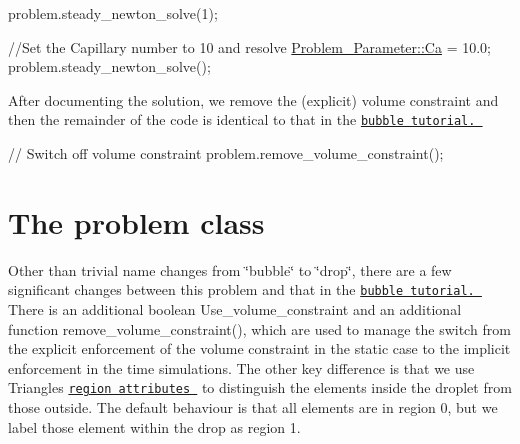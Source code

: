 \begin{DoxyCodeInclude}
 problem.steady\_newton\_solve(1); 

 \textcolor{comment}{//Set the Capillary number to 10 and resolve}
 \hyperlink{namespaceProblem__Parameter_af6194d2571881779c678fbabc1503d47}{Problem\_Parameter::Ca} = 10.0;
 problem.steady\_newton\_solve();

\end{DoxyCodeInclude}


After documenting the solution, we remove the (explicit) volume constraint and then the remainder of the code is identical to that in the \href{../../adaptive_bubble_in_channel/html/index.html}{\tt bubble tutorial. }


\begin{DoxyCodeInclude}
 \textcolor{comment}{// Switch off volume constraint}
 problem.remove\_volume\_constraint();

\end{DoxyCodeInclude}




 

\hypertarget{index_problem}{}\section{The problem class}\label{index_problem}
Other than trivial name changes from \char`\"{}bubble\char`\"{} to \char`\"{}drop\char`\"{}, there are a few significant changes between this problem and that in the \href{../../adaptive_bubble_in_channel/html/index.html}{\tt bubble tutorial. } There is an additional boolean {\ttfamily Use\+\_\+volume\+\_\+constraint} and an additional function {\ttfamily remove\+\_\+volume\+\_\+constraint()}, which are used to manage the switch from the explicit enforcement of the volume constraint in the static case to the implicit enforcement in the time simulations. The other key difference is that we use {\ttfamily Triangle\textquotesingle{}s} \href{../../../meshes/mesh_from_inline_triangle_internal_boundaries/html/index.html#def_extra_regions}{\tt region attributes } to distinguish the elements inside the droplet from those outside. The default behaviour is that all elements are in region 0, but we label those element within the drop as region 1.



 

